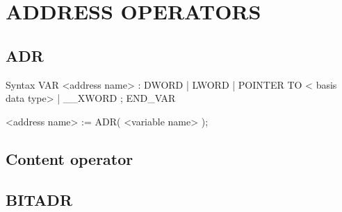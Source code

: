 \section{ADDRESS OPERATORS}
\subsection{ADR}

\begin{Box1}{Syntax} 
VAR
<address name> : DWORD | LWORD | POINTER TO < basis data type> | \_\_XWORD ;
END\_VAR

<address name> := ADR( <variable name> );

\end{Box1}	

\subsection{Content operator}
\subsection{BITADR}